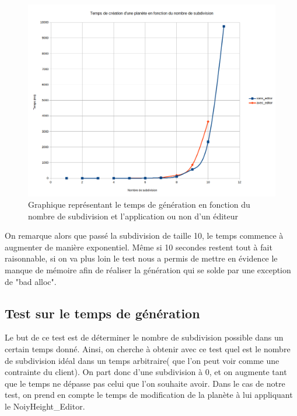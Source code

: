 \documentclass[a4paper]{article}
\begin{document}
\begin{figure}[!h]
    \begin{center}
        \includegraphics[scale=0.4]{img/perf.png}
        \caption{Graphique représentant le temps de génération en fonction du nombre de subdivision et l'application ou non d'un éditeur\protect\footnotemark}
        \label{graphperf}
    \end{center}
\end{figure}

On remarque alors que passé la subdivision de taille 10, le temps commence à augmenter de manière exponentiel. Même si 10 secondes restent tout à fait raisonnable, si on va plus loin le test nous a permis de mettre en évidence le manque de mémoire afin de réaliser la génération qui se solde par une exception de "bad alloc".


\subsection{Test sur le temps de génération}

Le but de ce test est de déterminer le nombre de subdivision possible dans un certain temps donné. Ainsi, on cherche à obtenir avec ce test quel est le nombre de subdivision idéal dans un temps arbitraire( que l'on peut voir comme une contrainte du client). On part donc d'une subdivision à 0, et on augmente tant que le temps ne dépasse pas celui que l'on souhaite avoir. Dans le cas de notre test, on prend en compte le temps de modification de la planète à lui appliquant le NoiyHeight\_Editor.
\end{document}
